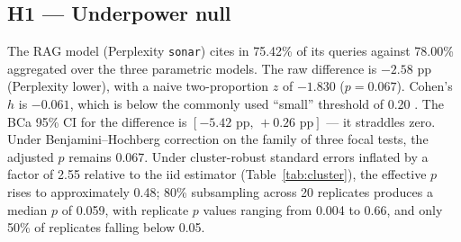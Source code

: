 \documentclass[preprint,12pt,authoryear]{elsarticle}
\begin{document}
\begin{table}[htbp]
\centering
\footnotesize
\caption{Hypothesis test results. Seed=42; bootstrap resamples = 10{,}000; cluster-robust SE by collection day (12 clusters). Dashes (---) denote non-applicable cells.}
\label{tab:tests}
\setlength{\tabcolsep}{4pt}
\end{table}

\subsection{H1 --- Underpower null}
The RAG model (Perplexity \texttt{sonar}) cites in 75.42\% of its queries against 78.00\% aggregated over the three parametric models. The raw difference is $-2.58$ pp (Perplexity lower), with a naive two-proportion $z$ of $-1.830$ ($p=0.067$). Cohen's $h$ is $-0.061$, which is below the commonly used ``small'' threshold of 0.20 \citep{Cohen1988}. The BCa 95\% CI for the difference is $[-5.42\text{ pp},\,+0.26\text{ pp}]$ --- it straddles zero. Under Benjamini--Hochberg correction on the family of three focal tests, the adjusted $p$ remains 0.067. Under cluster-robust standard errors inflated by a factor of 2.55 relative to the iid estimator (Table~\ref{tab:cluster}), the effective $p$ rises to approximately 0.48; 80\% subsampling across 20 replicates produces a median $p$ of 0.059, with replicate $p$ values ranging from 0.004 to 0.66, and only 50\% of replicates falling below 0.05.
\end{document}
